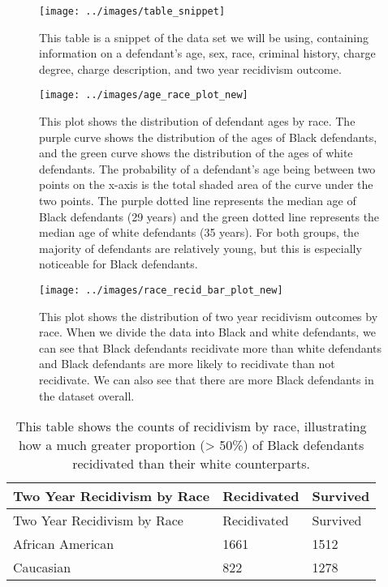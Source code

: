 \documentclass[water,article,submit,moreauthors,pdftex]{mdpi}
\begin{document}
\begin{figure}

{\centering \texttt{[image: ../images/table\_snippet]} 

}

\caption{This table is a snippet of the data set we will be using, containing information on a defendant's age, sex, race, criminal history, charge degree, charge description, and two year recidivism outcome.}\label{fig:table snip}
\end{figure}

\begin{figure}

{\centering \texttt{[image: ../images/age\_race\_plot\_new]} 

}

\caption{This plot shows the distribution of defendant ages by race. The purple curve shows the distribution of the ages of Black defendants, and the green curve shows the distribution of the ages of white defendants. The probability of a defendant's age being between two points on the x-axis is the total shaded area of the curve under the two points. The purple dotted line represents the median age of Black defendants (29 years) and the green dotted line represents the median age of white defendants (35 years). For both groups, the majority of defendants are relatively young, but this is especially noticeable for Black defendants.}\label{fig:age plot}
\end{figure}

\begin{figure}

{\centering \texttt{[image: ../images/race\_recid\_bar\_plot\_new]} 

}

\caption{This plot shows the distribution of two year recidivism outcomes by race. When we divide the data into Black and white defendants, we can see that Black defendants recidivate more than white defendants and Black defendants are more likely to recidivate than not recidivate. We can also see that there are more Black defendants in the dataset overall.}\label{fig:recid race plot}
\end{figure}

\begin{longtable}[]{@{}lll@{}}
\caption{This table shows the counts of recidivism by race, illustrating
how a much greater proportion (\textgreater{} 50\%) of Black defendants
recidivated than their white counterparts.
\label{tab:recid table}}\tabularnewline
\toprule
Two Year Recidivism by Race & Recidivated & Survived \\
\midrule
\endfirsthead
\toprule
Two Year Recidivism by Race & Recidivated & Survived \\
\midrule
\endhead
African American & 1661 & 1512 \\
Caucasian & 822 & 1278 \\
\bottomrule
\end{longtable}
\end{document}
